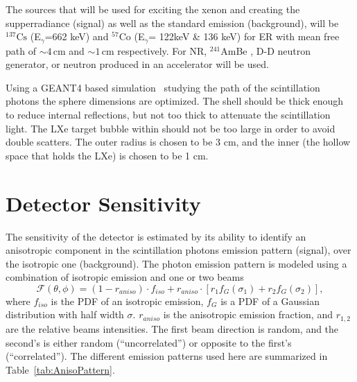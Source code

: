 The sources that will be used for exciting the xenon and creating the supperradiance (signal) as well as the standard emission (background), will be $^{137} \mathrm{Cs}$ 
(E$_\gamma$=662 keV) and $^{57} \mathrm{Co}$ (E$_\gamma$= 122keV \& 136 keV) for ER with mean free path of $\sim4$\,cm and $\sim1$\,cm respectively. For NR, $^{241}$AmBe , D-D neutron generator, or neutron produced in an accelerator will be used. 

Using a GEANT4 based simulation~\cite{AGOSTINELLI2003250} studying the path of the scintillation photons the sphere dimensions are optimized. The shell should be thick enough to reduce internal reflections, but not 
too thick to attenuate the scintillation light. The LXe target bubble within should not be too large in order to avoid double scatters. The outer radius is chosen to be 3 cm, and the inner (the hollow space that holds the LXe) is chosen to be 1 cm. 

\FloatBarrier
\section{Detector Sensitivity}
\label{sec:sim}
The sensitivity of the detector is estimated by its ability to identify an anisotropic component in the scintillation photons emission pattern (signal), over the isotropic one (background). The photon emission pattern is modeled using a combination of isotropic emission and one or two beams
\begin{equation}
\mathcal{F}(\theta,\phi) = (1-r_{aniso}) \cdot f_{iso} + r_{aniso}\cdot\left[r_1 f_G(\sigma_1) + r_2 f_G(\sigma_2) \right], 
\end{equation}  
where  $f_{iso}$ is the PDF of an isotropic emission, $f_G$ is a PDF of a Gaussian distribution with half width $\sigma$. $r_{aniso}$ is the anisotropic emission fraction, and $r_{1,2}$ are the relative beams intensities. The first beam direction is random, and the second's is either random 
(``uncorrelated'') or opposite to the first's (``correlated''). The different emission patterns used here are summarized in Table~\ref{tab:AnisoPattern}.
 
